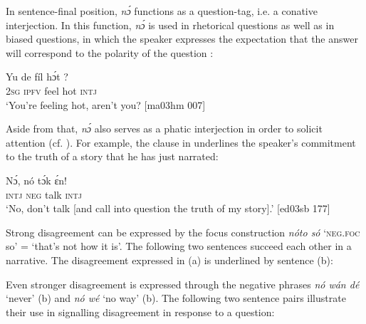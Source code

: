 In sentence-final position, \textit{nɔ́} functions as a question-tag, i.e. a conative interjection. In this function, \textit{nɔ́} is used in rhetorical questions as well as in biased questions, in which the speaker expresses the expectation that the answer will correspond to the polarity of the question : 


\ea%
    \label{ex:key:654}
    \gll Yu  de  fíl  hɔ́t  ?\\
\textsc{2sg}  \textsc{ipfv}  feel  hot  \textsc{intj}\\

\glt ‘You’re feeling hot, aren’t you? [ma03hm 007]
\z

Aside from that, \textit{nɔ́} also serves as a phatic interjection in order to solicit attention (cf. ). For example, the clause in  underlines the speaker’s commitment to the truth of a story that he has just narrated:


\ea%
    \label{ex:key:655}
    \gll Nɔ́,  nó  tɔ́k  ɛ́n!\\
\textsc{intj}  \textsc{neg}  talk  \textsc{intj}\\

\glt ‘No, don’t talk [and call into question the truth of my story].’ [ed03sb 177]
\z

Strong disagreement can be expressed by the focus construction \textit{nóto só} ‘\textsc{neg}.\textsc{foc} so’ = ‘that’s not how it is’. The following two sentences succeed each other in a narrative. The disagreement expressed in (a) is underlined by sentence (b): 


\ea%
    \label{ex:key:656}
\z
\z

Even stronger disagreement is expressed through the negative phrases \textit{nó wán dé} ‘never’ (b) and \textit{nó wé} ‘no way’ (b). The following two sentence pairs illustrate their use in signalling disagreement in response to a question:


